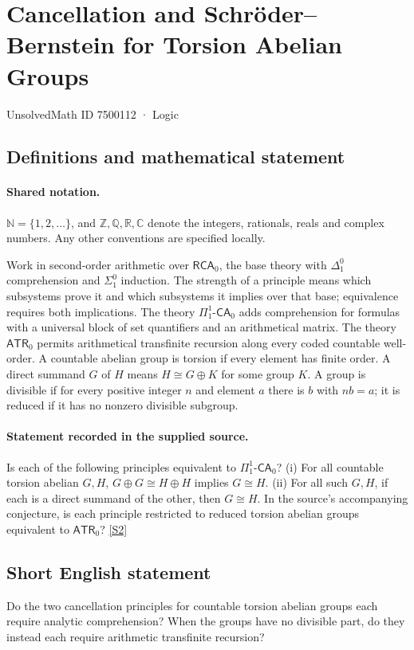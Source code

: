 \documentclass[11pt]{article}
\newcommand{\sref}[2]{\hyperlink{source:#1:#2}{[S#2]}}
\begin{document}
\setcounter{section}{7500111}
\section{Cancellation and Schröder–Bernstein for Torsion Abelian Groups}\label{7500112}
{\small\sffamily UnsolvedMath ID 7500112 · Logic}
\subsection{Definitions and mathematical statement}

\paragraph{Shared notation.}$\mathbb N=\{1,2,\ldots\}$, and $\mathbb Z,\mathbb Q,\mathbb R,\mathbb C$ denote the integers, rationals, reals and complex numbers. Any other conventions are specified locally.


Work in second-order arithmetic over $\mathsf{RCA}_0$, the base theory with $\Delta^0_1$ comprehension and $\Sigma^0_1$ induction. The strength of a principle means which subsystems prove it and which subsystems it implies over that base; equivalence requires both implications.  The theory $\Pi^1_1\text{-}\mathsf{CA}_0$ adds comprehension for formulas with a universal block of set quantifiers and an arithmetical matrix. The theory $\mathsf{ATR}_0$ permits arithmetical transfinite recursion along every coded countable well-order. A countable abelian group is torsion if every element has finite order. A direct summand $G$ of $H$ means $H\cong G\oplus K$ for some group $K$. A group is divisible if for every positive integer $n$ and element $a$ there is $b$ with $nb=a$; it is reduced if it has no nonzero divisible subgroup.
\paragraph{Statement recorded in the supplied source.}
Is each of the following principles equivalent to $\Pi^1_1\text{-}\mathsf{CA}_0$? (i) For all countable torsion abelian $G,H$, $G\oplus G\cong H\oplus H$ implies $G\cong H$. (ii) For all such $G,H$, if each is a direct summand of the other, then $G\cong H$. In the source’s accompanying conjecture, is each principle restricted to reduced torsion abelian groups equivalent to $\mathsf{ATR}_0$? \sref{7500112}{2}
\subsection{Short English statement}
Do the two cancellation principles for countable torsion abelian groups each require analytic comprehension? When the groups have no divisible part, do they instead each require arithmetic transfinite recursion?
\end{document}
